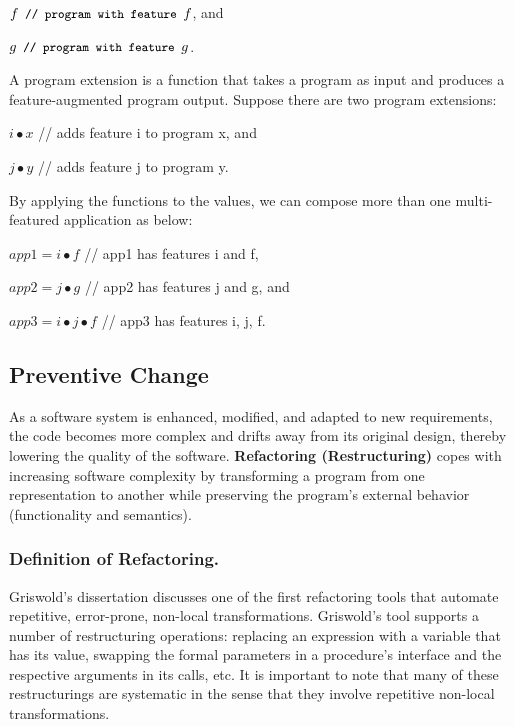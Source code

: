 \documentclass[runningheads,a4paper]{llncs}
\newcommand{\text}[1]{\footnotesize{\texttt{#1}}\normalsize}
\begin{document}
$f \text{	// program with feature }f$, and

$g\text{	// program with feature }g$.

\noindent
A program extension is a function that takes a program as input and produces a feature-augmented program output. Suppose there are two program extensions:

$i \bullet x$ // adds feature i to program x, and 

$j \bullet y$ // adds feature j to program y.

By applying the functions to the values, we can compose more than one multi-featured application as below:

$app1 = i \bullet f$ // app1 has features i and f,

$app2 = j \bullet g$ // app2 has features j and g, and
 
$app3 = i \bullet j \bullet f$ // app3 has features i, j, f.

 
 

\subsection{Preventive Change}
\label{sec:preventive}

As a software system is enhanced, modified, and adapted to new requirements, the code becomes more complex and drifts away from its original design, thereby lowering the quality of the software. {\bf Refactoring (Restructuring)} \cite{1999:RID,Griswold:1992,Opdyke1992:ROF,Mens2004:SSR} copes with increasing software complexity by transforming a program from one representation to another while preserving the program's external behavior (functionality and semantics).%

\subsubsection{Definition of Refactoring.} 
Griswold's dissertation \cite{Griswold:1992} discusses one of the first refactoring tools that automate repetitive, error-prone, non-local transformations. Griswold's tool supports a number of restructuring operations: replacing an expression with a variable that has its value, swapping the formal parameters in a procedure's interface and the respective arguments in its calls, etc. It is important to note that many of these restructurings are systematic in the sense that they involve repetitive non-local transformations. 
\end{document}
